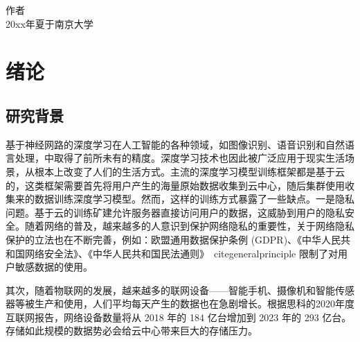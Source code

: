 \documentclass[winfonts,master,twoside]{njuthesis}
\begin{document}
%
\begin{preface}
\lipsum[1]
\vspace{1cm}
\begin{flushright}
作者\\
20xx年夏于南京大学
\end{flushright}

\end{preface}

\tableofcontents

\listoffigures

\listoftables

\mainmatter

\chapter{绪论}\label{chapter_introduction}
\section{研究背景}
基于神经网路的深度学习在人工智能的各种领域，如图像识别、语音识别和自然语言处理，中取得了前所未有的精度。深度学习技术也因此被广泛应用于现实生活场景，从根本上改变了人们的生活方式。主流的深度学习模型训练框架都是基于云的，这类框架需要首先将用户产生的海量原始数据收集到云中心，随后集群使用收集来的数据训练深度学习模型。然而，这样的训练方式暴露了一些缺点。一是隐私问题。基于云的训练矿建允许服务器直接访问用户的数据，这威胁到用户的隐私安全。随着网络的普及，越来越多的人意识到保护网络隐私的重要性，关于网络隐私保护的立法也在不断完善，例如：欧盟通用数据保护条例 (GDPR)\cite{GDPR}、《中华人民共和国网络安全法》\cite{cybersecurity}、《中华人民共和国民法通则》\ cite{generalprinciple} 限制了对用户敏感数据的使用。

其次，随着物联网的发展，越来越多的联网设备——智能手机、摄像机和智能传感器等被生产和使用，人们平均每天产生的数据也在急剧增长。根据思科的2020年度互联网报告\cite{ciscoannual}，网络设备数量将从 2018 年的 184 亿台增加到 2023 年的 293 亿台。存储如此规模的数据势必会给云中心带来巨大的存储压力。
\end{document}
